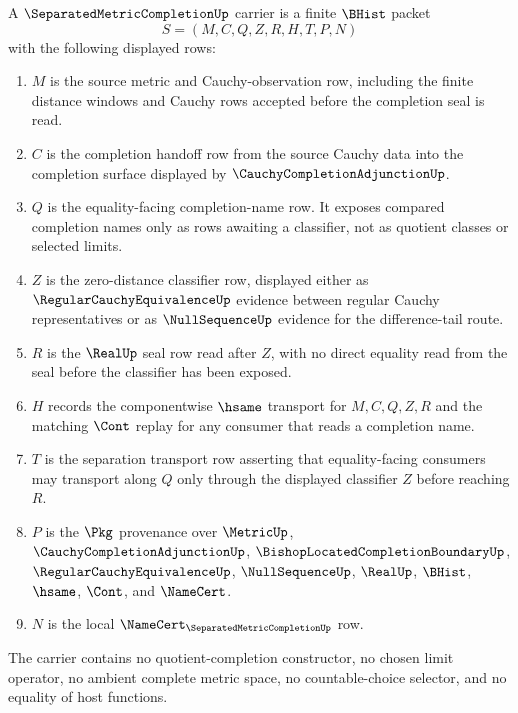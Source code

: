 \begin{definition}
\label{def:separated-metric-completion-carrier}
A $\SeparatedMetricCompletionUp$ carrier is a finite $\BHist$ packet
$$
S=(M,C,Q,Z,R,H,T,P,N)
$$
with the following displayed rows:
\begin{enumerate}
\item $M$ is the source metric and Cauchy-observation row, including the finite distance windows and Cauchy rows accepted before the completion seal is read.
\item $C$ is the completion handoff row from the source Cauchy data into the completion surface displayed by $\CauchyCompletionAdjunctionUp$.
\item $Q$ is the equality-facing completion-name row. It exposes compared completion names only as rows awaiting a classifier, not as quotient classes or selected limits.
\item $Z$ is the zero-distance classifier row, displayed either as $\RegularCauchyEquivalenceUp$ evidence between regular Cauchy representatives or as $\NullSequenceUp$ evidence for the difference-tail route.
\item $R$ is the $\RealUp$ seal row read after $Z$, with no direct equality read from the seal before the classifier has been exposed.
\item $H$ records the componentwise $\hsame$ transport for $M,C,Q,Z,R$ and the matching $\Cont$ replay for any consumer that reads a completion name.
\item $T$ is the separation transport row asserting that equality-facing consumers may transport along $Q$ only through the displayed classifier $Z$ before reaching $R$.
\item $P$ is the $\Pkg$ provenance over $\MetricUp$, $\CauchyCompletionAdjunctionUp$, $\BishopLocatedCompletionBoundaryUp$, $\RegularCauchyEquivalenceUp$, $\NullSequenceUp$, $\RealUp$, $\BHist$, $\hsame$, $\Cont$, and $\NameCert$.
\item $N$ is the local $\NameCert_{\SeparatedMetricCompletionUp}$ row.
\end{enumerate}
The carrier contains no quotient-completion constructor, no chosen limit operator, no ambient complete metric space, no countable-choice selector, and no equality of host functions.
\end{definition}

